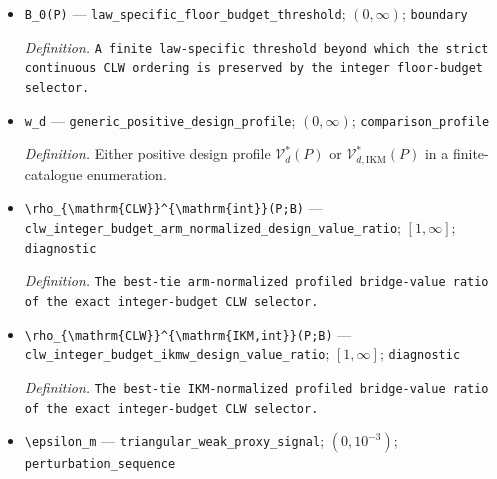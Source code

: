 \documentclass{article}
\begin{document}
\begin{itemize}
  \item \texttt{B\_\allowbreak{}0(P)} --- \texttt{law\_\allowbreak{}specific\_\allowbreak{}floor\_\allowbreak{}budget\_\allowbreak{}threshold}; \((0,\infty)\); \texttt{boundary}
  \par\smallskip\noindent\emph{Definition.} \texttt{A finite law-\allowbreak{}specific threshold beyond which the strict continuous CLW ordering is preserved by the integer floor-\allowbreak{}budget selector.}
  \item \texttt{w\_\allowbreak{}d} --- \texttt{generic\_\allowbreak{}positive\_\allowbreak{}design\_\allowbreak{}profile}; \((0,\infty)\); \texttt{comparison\_\allowbreak{}profile}
  \par\smallskip\noindent\emph{Definition.} Either positive design profile \(\mathcal V_d^*(P)\) or \(\mathcal V_{d,\mathrm{IKM}}^*(P)\) in a finite-catalogue enumeration.
  \item \texttt{\textbackslash{}\allowbreak{}rho\_\allowbreak{}\{\textbackslash{}\allowbreak{}mathrm\{CLW\}\allowbreak{}\}\allowbreak{}\textasciicircum{}\{\textbackslash{}\allowbreak{}mathrm\{int\}\allowbreak{}\}\allowbreak{}(P;\allowbreak{}B)} --- \texttt{clw\_\allowbreak{}integer\_\allowbreak{}budget\_\allowbreak{}arm\_\allowbreak{}normalized\_\allowbreak{}design\_\allowbreak{}value\_\allowbreak{}ratio}; \([1,\infty]\); \texttt{diagnostic}
  \par\smallskip\noindent\emph{Definition.} \texttt{The best-\allowbreak{}tie arm-\allowbreak{}normalized profiled bridge-\allowbreak{}value ratio of the exact integer-\allowbreak{}budget CLW selector.}
  \item \texttt{\textbackslash{}\allowbreak{}rho\_\allowbreak{}\{\textbackslash{}\allowbreak{}mathrm\{CLW\}\allowbreak{}\}\allowbreak{}\textasciicircum{}\{\textbackslash{}\allowbreak{}mathrm\{IKM,\allowbreak{}int\}\allowbreak{}\}\allowbreak{}(P;\allowbreak{}B)} --- \texttt{clw\_\allowbreak{}integer\_\allowbreak{}budget\_\allowbreak{}ikmw\_\allowbreak{}design\_\allowbreak{}value\_\allowbreak{}ratio}; \([1,\infty]\); \texttt{diagnostic}
  \par\smallskip\noindent\emph{Definition.} \texttt{The best-\allowbreak{}tie IKM-\allowbreak{}normalized profiled bridge-\allowbreak{}value ratio of the exact integer-\allowbreak{}budget CLW selector.}
  \item \texttt{\textbackslash{}\allowbreak{}epsilon\_\allowbreak{}m} --- \texttt{triangular\_\allowbreak{}weak\_\allowbreak{}proxy\_\allowbreak{}signal}; \((0,10^{-3})\); \texttt{perturbation\_\allowbreak{}sequence}

\end{itemize}
\end{document}
